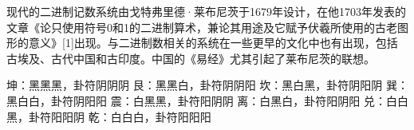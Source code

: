 \documentclass[main.tex]{subfiles}
\begin{document}
现代的二进制记数系统由戈特弗里德·莱布尼茨于1679年设计，在他1703年发表的文章《论只使用符号0和1的二进制算术，兼论其用途及它赋予伏羲所使用的古老图形的意义》[1]出现。与二进制数相关的系统在一些更早的文化中也有出现，包括古埃及、古代中国和古印度。中国的《易经》尤其引起了莱布尼茨的联想。

坤：黑黑黑，卦符阴阴阴
艮：黑黑白，卦符阴阴阳
坎：黑白黑，卦符阴阳阴
巽：黑白白，卦符阴阳阳
震：白黑黑，卦符阳阴阴
离：白黑白，卦符阳阴阳
兑：白白黑，卦符阳阳阴
乾：白白白，卦符阳阳阳

\newpage
\end{document}
